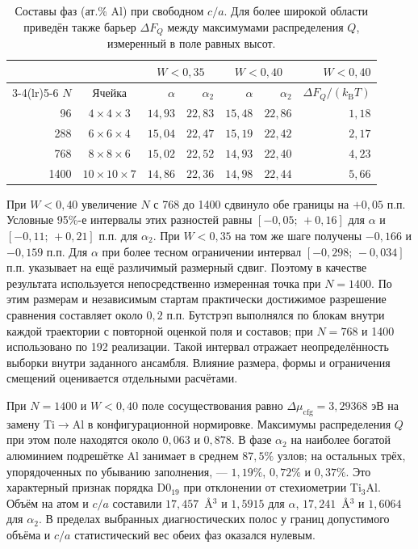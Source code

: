\documentclass[11pt,a4paper]{article}
\begin{document}
\begin{table}[htbp]
\centering\small
\caption{Составы фаз (ат.\% Al) при свободном $c/a$. Для более
широкой области приведён также барьер $\Delta F_Q$ между максимумами
распределения $Q$, измеренный в поле равных высот.}
\label{tab:bulk-size}
\begin{tabular}{@{}r c rr rr r@{}}
\toprule
 & & \multicolumn{2}{c}{$W<0{,}35$} & \multicolumn{2}{c}{$W<0{,}40$}
 & $W<0{,}40$\\
\cmidrule(lr){3-4}\cmidrule(lr){5-6}
$N$ & Ячейка & $\alpha$ & $\alpha_2$ & $\alpha$ & $\alpha_2$
 & $\Delta F_Q/(k_{\mathrm B}T)$\\
\midrule
  96 & $4\times4\times3$   & $14{,}93$ & $22{,}83$ & $15{,}48$ & $22{,}86$ & $1{,}18$\\
 288 & $6\times6\times4$   & $15{,}04$ & $22{,}47$ & $15{,}19$ & $22{,}42$ & $2{,}17$\\
 768 & $8\times8\times6$   & $15{,}02$ & $22{,}52$ & $14{,}93$ & $22{,}40$ & $4{,}23$\\
1400 & $10\times10\times7$ & $14{,}86$ & $22{,}36$ & $14{,}98$ & $22{,}44$ & $5{,}66$\\
\bottomrule
\end{tabular}
\end{table}

При $W<0{,}40$ увеличение $N$ с 768 до 1400 сдвинуло обе границы
на $+0{,}05$ п.п. Условные 95\%-е интервалы этих разностей равны
$[-0{,}05;\,+0{,}16]$ для $\alpha$ и $[-0{,}11;\,+0{,}21]$ п.п.
для $\alpha_2$. При $W<0{,}35$ на том же шаге получены
$-0{,}166$ и $-0{,}159$ п.п. Для $\alpha$ при более тесном
ограничении интервал $[-0{,}298;\,-0{,}034]$ п.п. указывает на
ещё различимый размерный сдвиг. Поэтому в качестве результата
используется непосредственно измеренная точка при $N=1400$.
По этим размерам и независимым стартам практически достижимое
разрешение сравнения составляет около $0{,}2$ п.п. Бутстрэп
выполнялся по блокам внутри каждой траектории с повторной оценкой
поля и составов; при $N=768$ и 1400 использовано по 192 реализации.
Такой интервал отражает неопределённость выборки внутри заданного
ансамбля. Влияние размера, формы и ограничения смещений оценивается
отдельными расчётами.

При $N=1400$ и $W<0{,}40$ поле сосуществования равно
$\Delta\mu_{\mathrm{cfg}}=3{,}29368$ эВ на замену Ti$\to$Al
в конфигурационной нормировке. Максимумы распределения $Q$ при
этом поле находятся около $0{,}063$ и $0{,}878$. В фазе $\alpha_2$
на наиболее богатой алюминием подрешётке Al занимает в среднем
$87{,}5\%$ узлов; на остальных трёх, упорядоченных по убыванию
заполнения, --- $1{,}19\%$, $0{,}72\%$ и $0{,}37\%$.
Это характерный признак порядка D0$_{19}$ при отклонении от
стехиометрии Ti$_3$Al. Объём на атом и $c/a$ составили
$17{,}457$~\AA$^3$ и $1{,}5915$ для $\alpha$, $17{,}241$~\AA$^3$
и $1{,}6064$ для $\alpha_2$. В пределах выбранных диагностических
полос у границ допустимого объёма и $c/a$ статистический вес обеих
фаз оказался нулевым.
\end{document}
